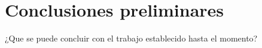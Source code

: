 \chapter{Conclusiones preliminares}
\ifpdf
    \graphicspath{{Chapter4/Chapter4Figs/PNG/}{Chapter4/Chapter4Figs/PDF/}{Chapter4/ChapterFigs/}}
\else
    \graphicspath{{Chapter4/Chapter4Figs/EPS/}{Chapter4/Chapter4Figs/}}
\fi


¿Que se puede concluir con el trabajo establecido hasta el momento?


